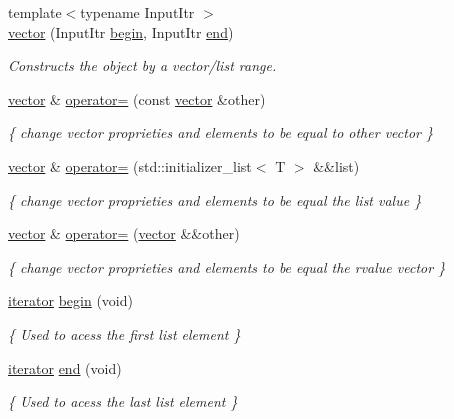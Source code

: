 \begin{DoxyCompactItemize}
{\footnotesize template$<$typename Input\+Itr $>$ }\\\hyperlink{classvector_a7d26c70dd3a1215357889bb3e0361b87}{vector} (Input\+Itr \hyperlink{classvector_a22ebe2c584d5e94106e10eef4e8d7baa}{begin}, Input\+Itr \hyperlink{classvector_aad5e92e775a9fa4f98b5b0666b6c0e2d}{end})
\begin{DoxyCompactList}\small\item\em Constructs the object by a vector/list range. \end{DoxyCompactList}\item 
\hyperlink{classvector}{vector} \& \hyperlink{classvector_a32e6ef13224cb61af56c446a2570225b}{operator=} (const \hyperlink{classvector}{vector} \&other)
\begin{DoxyCompactList}\small\item\em \{ change vector proprieties and elements to be equal to other vector \} \end{DoxyCompactList}\item 
\hyperlink{classvector}{vector} \& \hyperlink{classvector_aa6508b05970549d0b7a343a82aadc081}{operator=} (std\+::initializer\+\_\+list$<$ T $>$ \&\&list)
\begin{DoxyCompactList}\small\item\em \{ change vector proprieties and elements to be equal the list value \} \end{DoxyCompactList}\item 
\hyperlink{classvector}{vector} \& \hyperlink{classvector_aadbb2620429abb0ac75e2baf47b48cfe}{operator=} (\hyperlink{classvector}{vector} \&\&other)
\begin{DoxyCompactList}\small\item\em \{ change vector proprieties and elements to be equal the rvalue vector \} \end{DoxyCompactList}\item 
\hyperlink{classMyIterator}{iterator} \hyperlink{classvector_a22ebe2c584d5e94106e10eef4e8d7baa}{begin} (void)
\begin{DoxyCompactList}\small\item\em \{ Used to acess the first list element \} \end{DoxyCompactList}\item 
\hyperlink{classMyIterator}{iterator} \hyperlink{classvector_aad5e92e775a9fa4f98b5b0666b6c0e2d}{end} (void)
\begin{DoxyCompactList}\small\item\em \{ Used to acess the last list element \} \end{DoxyCompactList}\item 

\end{DoxyCompactItemize}
